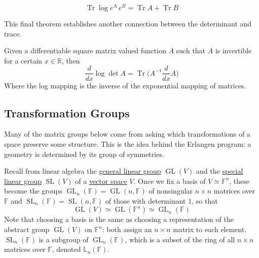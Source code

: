 \documentclass{article}
\DeclareMathOperator{\Tr}{Tr}
\DeclareMathOperator{\GL}{GL}
\DeclareMathOperator{\SL}{SL}
\newcounter{theorem}[section]
\begin{document}
    \begin{corollary}
      \begin{equation}
        \Tr{\log{e^A \, e^B}} = \Tr{A} + \Tr{B}
      \end{equation}
    \end{corollary}

    This final theorem establishes another connection between the determinant and trace. 

    \begin{theorem}
      Given a differentiable square matrix valued function $A$ such that $A$ is invertible for a certain $x \in \mathbb{R}$, then 
      \begin{equation}
        \frac{d}{d x} \log{\det{A}} = \Tr \bigg( A^{-1} \frac{d}{d x} A \bigg)
      \end{equation}
      Where the log mapping is the inverse of the exponential mapping of matrices. 
    \end{theorem}

  \subsection{Transformation Groups}

    Many of the matrix groups below come from asking which transformations of a space preserve some structure. This is the idea behind the Erlangen program: a geometry is determined by its group of symmetries. 

    Recall from linear algebra the \hyperref[lin-def:general-linear-group]{general linear group} $\GL(V)$ and the \hyperref[lin-def:special-linear-group]{special linear group} $\SL(V)$ of a \hyperref[lin-def:vector-space]{vector space} $V$. Once we fix a basis of $V \simeq \mathbb{F}^n$, these become the groups $\GL_n(\mathbb{F}) = \GL(n, \mathbb{F})$ of nonsingular $n \times n$ matrices over $\mathbb{F}$ and $\SL_n(\mathbb{F}) = \SL(n, \mathbb{F})$ of those with determinant $1$, so that
    \begin{equation}
      \GL(V) \simeq \GL(\mathbb{F}^n) \simeq \GL_n(\mathbb{F})
    \end{equation}
    Note that choosing a basis is the same as choosing a representation of the abstract group $\GL(V)$ on $\mathbb{F}^n$: both assign an $n \times n$ matrix to each element. $\SL_n(\mathbb{F})$ is a subgroup of $\GL_n(\mathbb{F})$, which is a subset of the ring of all $n \times n$ matrices over $\mathbb{F}$, denoted $\mathbb{L}_n(\mathbb{F})$. 
\end{document}
